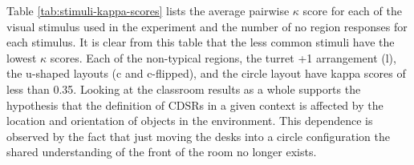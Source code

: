 \documentclass[11pt,letterpaper]{article}
\begin{document}


Table \ref{tab:stimuli-kappa-scores} lists the average pairwise $\kappa$ score for each of the visual stimulus used in the experiment and the number of no region responses for each stimulus.  It is clear from this table that the less common stimuli have the lowest $\kappa$ scores.  Each of the non-typical regions, the turret +1 arrangement (l), the u-shaped layouts (c and c-flipped), and the circle layout have kappa scores of less than 0.35. Looking at the classroom results as a whole supports the hypothesis that the definition of CDSRs in a given context is affected by the location and orientation of objects in the environment.  This dependence is observed by the fact that just moving the desks into a circle configuration the shared understanding of the front of the room no longer exists.

\end{document}
